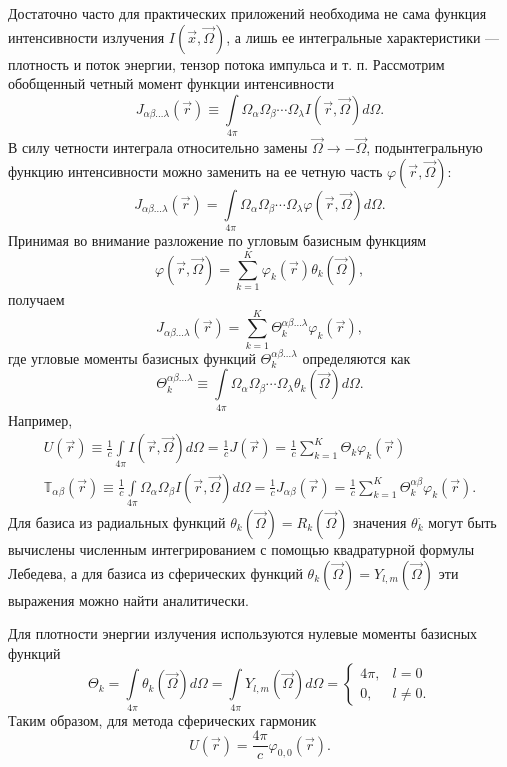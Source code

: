 Достаточно часто для практических приложений необходима не сама функция интенсивности излучения $I(\vec x, \vec \Omega)$, а лишь ее интегральные характеристики --- плотность и поток энергии, тензор потока импульса и т. п. Рассмотрим обобщенный четный момент функции интенсивности
\[
J_{\alpha\beta\dots\lambda}(\vec r) \equiv \int\limits_{4\pi} \Omega_\alpha \Omega_\beta \cdots \Omega_\lambda I(\vec r, \vec \Omega) d\Omega.
\]
В силу четности интеграла относительно замены $\vec \Omega \to -\vec \Omega$, подынтегральную функцию интенсивности можно заменить на ее четную часть $\varphi(\vec r, \vec \Omega)$:
\[
J_{\alpha\beta\dots\lambda}(\vec r) = \int\limits_{4\pi} \Omega_\alpha \Omega_\beta \cdots \Omega_\lambda \varphi(\vec r, \vec \Omega) d\Omega.
\]
Принимая во внимание разложение по угловым базисным функциям
\[
\varphi(\vec r, \vec \Omega) = \sum_{k = 1}^{K} \varphi_k(\vec r) \theta_k(\vec \Omega),
\]
получаем
\[
J_{\alpha\beta\dots\lambda}(\vec r) = \sum_{k=1}^{K} \Theta_k^{\alpha\beta\dots\lambda} \varphi_k(\vec r),
\]
где угловые моменты базисных функций $\Theta_k^{\alpha\beta\dots\lambda}$ определяются как
\[
\Theta_k^{\alpha\beta\dots\lambda} \equiv \int\limits_{4\pi} \Omega_\alpha \Omega_\beta \cdots \Omega_\lambda \theta_k(\vec \Omega) d\Omega.
\]
Например, 
\begin{gather*}
U(\vec r) \equiv \frac{1}{c}\int\limits_{4\pi} I(\vec r, \vec \Omega) d\Omega = \frac{1}{c} J(\vec r) = \frac{1}{c} \sum_{k=1}^{K} \Theta_k \varphi_k(\vec r)\\
\mathbb T_{\alpha\beta}(\vec r) \equiv \frac{1}{c}\int\limits_{4\pi} \Omega_\alpha \Omega_\beta I(\vec r, \vec \Omega) d\Omega = \frac{1}{c} J_{\alpha\beta}(\vec r) = \frac{1}{c} \sum_{k=1}^{K} \Theta_k^{\alpha\beta} \varphi_k(\vec r).
\end{gather*}
Для базиса из радиальных функций $\theta_k(\vec \Omega) = R_k(\vec \Omega)$ значения $\theta_{k}^{\cdot}$ могут быть вычислены численным интегрированием с помощью квадратурной формулы Лебедева, а для базиса из сферических функций $\theta_k(\vec \Omega) = Y_{l,m}(\vec \Omega)$ эти выражения можно найти аналитически.

Для плотности энергии излучения используются нулевые моменты базисных функций
\[
\Theta_k = \int\limits_{4\pi} \theta_k(\vec \Omega) d\Omega = 
\int\limits_{4\pi} Y_{l,m}(\vec \Omega) d\Omega = 
\begin{cases}
4\pi, &l = 0\\
0, &l \neq 0.
\end{cases}
\]
Таким образом, для метода сферических гармоник
\[
U(\vec r) = \frac{4\pi}{c} \varphi_{0,0}(\vec r).
\]

